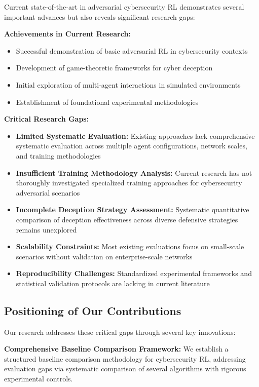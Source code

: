 \documentclass[12pt,oneside]{article}
\begin{document}
Current state-of-the-art in adversarial cybersecurity RL demonstrates several important advances but also reveals significant research gaps:

\textbf{Achievements in Current Research:}
\begin{itemize}
\item Successful demonstration of basic adversarial RL in cybersecurity contexts
\item Development of game-theoretic frameworks for cyber deception
\item Initial exploration of multi-agent interactions in simulated environments
\item Establishment of foundational experimental methodologies
\end{itemize}

\textbf{Critical Research Gaps:}
\begin{itemize}
\item \textbf{Limited Systematic Evaluation:} Existing approaches lack comprehensive systematic evaluation across multiple agent configurations, network scales, and training methodologies
\item \textbf{Insufficient Training Methodology Analysis:} Current research has not thoroughly investigated specialized training approaches for cybersecurity adversarial scenarios
\item \textbf{Incomplete Deception Strategy Assessment:} Systematic quantitative comparison of deception effectiveness across diverse defensive strategies remains unexplored
\item \textbf{Scalability Constraints:} Most existing evaluations focus on small-scale scenarios without validation on enterprise-scale networks
\item \textbf{Reproducibility Challenges:} Standardized experimental frameworks and statistical validation protocols are lacking in current literature
\end{itemize}

\subsection{Positioning of Our Contributions}

Our research addresses these critical gaps through several key innovations:

\textbf{Comprehensive Baseline Comparison Framework:} We establish a structured baseline comparison methodology for cybersecurity RL, addressing evaluation gaps via systematic comparison of several algorithms with rigorous experimental controls.
\end{document}
